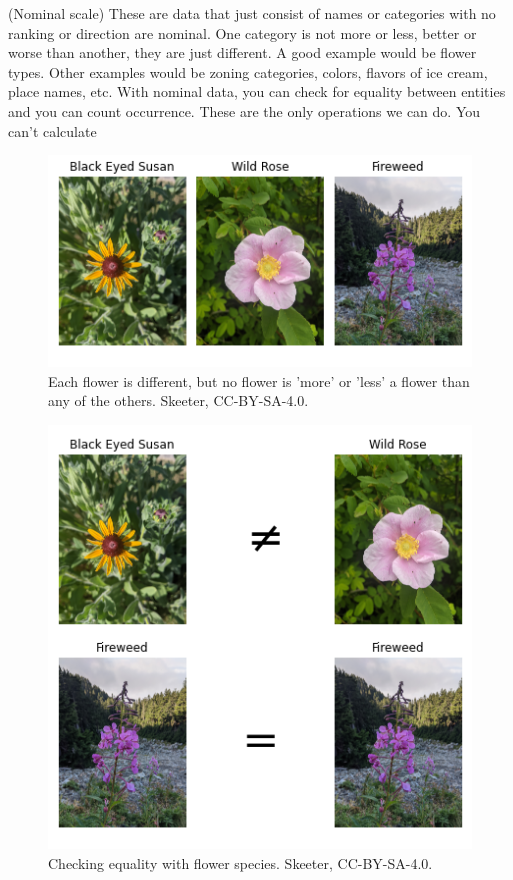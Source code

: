 \documentclass[
]{book}
\begin{document}
(Nominal scale) These are data that just consist of names or categories with no ranking or direction are nominal. One category is not more or less, better or worse than another, they are just different. A good example would be flower types. Other examples would be zoning categories, colors, flavors of ice cream, place names, etc. With nominal data, you can check for equality between entities and you can count occurrence. These are the only operations we can do. You can't calculate

\begin{figure}
\includegraphics[width=0.75\linewidth]{images/03-flowers-nominal} \caption{Each flower is different, but no flower is 'more' or 'less' a flower than any of the others. Skeeter, CC-BY-SA-4.0.}\label{fig:3-flowers-nominal}
\end{figure}

\begin{figure}
\includegraphics[width=0.75\linewidth]{images/03-nominal-opperations} \caption{Checking equality with flower species. Skeeter, CC-BY-SA-4.0.}\label{fig:3-nominal-opperations}
\end{figure}
\end{document}
